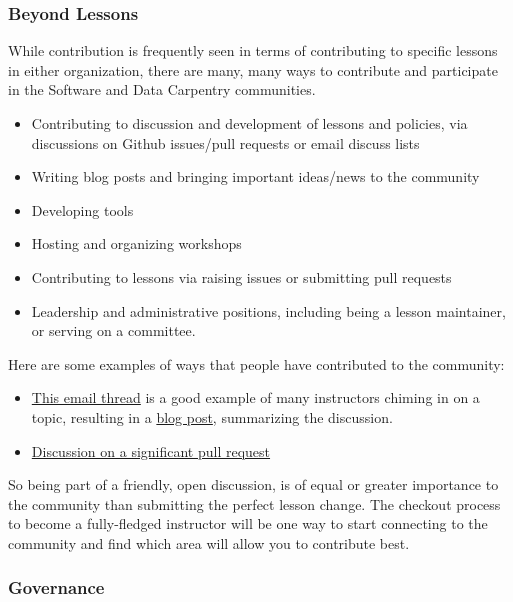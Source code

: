 \subsubsection{Beyond Lessons}\label{beyond-lessons}

While contribution is frequently seen in terms of contributing to
specific lessons in either organization, there are many, many ways to
contribute and participate in the Software and Data Carpentry
communities.

\begin{itemize}
\itemsep1pt\parskip0pt
\item
  Contributing to discussion and development of lessons and policies,
  via discussions on Github issues/pull requests or email discuss lists
\item
  Writing blog posts and bringing important ideas/news to the community
\item
  Developing tools
\item
  Hosting and organizing workshops
\item
  Contributing to lessons via raising issues or submitting pull requests
\item
  Leadership and administrative positions, including being a lesson
  maintainer, or serving on a committee.
\end{itemize}

Here are some examples of ways that people have contributed to the
community:

\begin{itemize}
\itemsep1pt\parskip0pt
\item
  \href{http://lists.software-carpentry.org/pipermail/discuss/2015-October/003396.html}{This
  email thread} is a good example of many instructors chiming in on a
  topic, resulting in a
  \href{http://software-carpentry.org/blog/2015/10/pulling-along-those-behind.html}{blog
  post}, summarizing the discussion.
\item
  \href{https://github.com/swcarpentry/r-novice-gapminder/pull/89}{Discussion
  on a significant pull request}
\end{itemize}

So being part of a friendly, open discussion, is of equal or greater
importance to the community than submitting the perfect lesson change.
The checkout process to
become a fully-fledged instructor will be one way to start connecting to
the community and find which area will allow you to contribute best.

\subsubsection{Governance}\label{governance}

